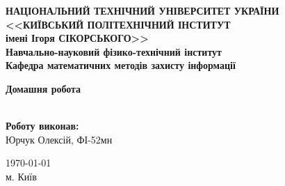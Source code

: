 \thispagestyle{empty}
\linespread{1.1}

\begin{center}
    {\bfseries\large
        НАЦІОНАЛЬНИЙ ТЕХНІЧНИЙ УНІВЕРСИТЕТ УКРАЇНИ \\
        <<КИЇВСЬКИЙ ПОЛІТЕХНІЧНИЙ ІНСТИТУТ \\
        імені Ігоря СІКОРСЬКОГО>> \\
        Навчально-науковий фізико-технічний інститут \\
        \medskip
        Кафедра математичних методів захисту інформації}
\end{center}

\begin{center}
\vspace{40mm}
{\bfseries\huge Домашня робота} \\
{\bfseries\huge {}} \\
\end{center}

\vspace{55mm}
\begin{center}
    \hfill
    \begin{minipage}[t]{0.4\textwidth}
        \begin{flushright}
            \textbf{Роботу виконав:} \\
            Юрчук Олексій, ФІ-52мн
        \end{flushright}
    \end{minipage}
\end{center}

\vfill
\begin{center}
    \today \\
    {м. Київ}
\end{center}

\newpage
{}
